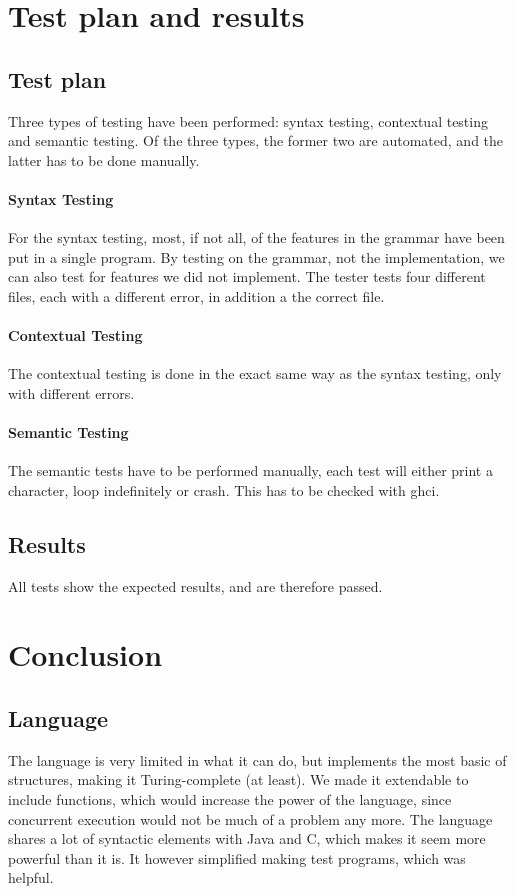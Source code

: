 \documentclass[10pt,a4paper]{report}
\begin{document}
\chapter{Test plan and results}

\section{Test plan}
Three types of testing have been performed: syntax testing, contextual testing and semantic testing. Of the three types, the former two are automated, and the latter has to be done manually.
\subsubsection*{Syntax Testing}
For the syntax testing, most, if not all, of the features in the grammar have been put in a single program. By testing on the grammar, not the implementation, we can also test for features we did not implement. The tester tests four different files, each with a different error, in addition a the correct file.
\subsubsection*{Contextual Testing}
The contextual testing is done in the exact same way as the syntax testing, only with different errors.
\subsubsection*{Semantic Testing}
The semantic tests have to be performed manually, each test will either print a character, loop indefinitely or crash. This has to be checked with ghci.

\section{Results}
All tests show the expected results, and are therefore passed.

\chapter{Conclusion}
\section{Language}
The language is very limited in what it can do, but implements the most basic of structures, making it Turing-complete (at least). We made it extendable to include functions, which would increase the power of the language, since concurrent execution would not be much of a problem any more. The language shares a lot of syntactic elements with Java and C, which makes it seem more powerful than it is. It however simplified making test programs, which was helpful. 
\end{document}
